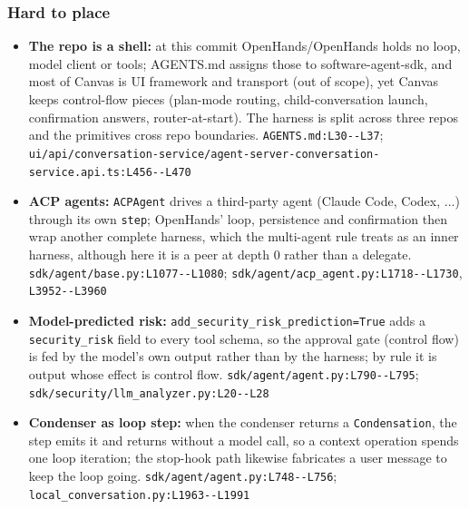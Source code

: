 \subsubsection*{Hard to place}
\begin{itemize}
\item \textbf{The repo is a shell:} at this commit OpenHands/OpenHands holds no loop, model client or tools; AGENTS.md assigns those to software-agent-sdk, and most of Canvas is UI framework and transport (out of scope), yet Canvas keeps control-flow pieces (plan-mode routing, child-conversation launch, confirmation answers, router-at-start). The harness is split across three repos and the primitives cross repo boundaries. \texttt{AGENTS.\allowbreak{}md:\allowbreak{}L30-\allowbreak{}-\allowbreak{}L37}; \texttt{ui/\allowbreak{}api/\allowbreak{}conversation-\allowbreak{}service/\allowbreak{}agent-\allowbreak{}server-\allowbreak{}conversation-\allowbreak{}service.\allowbreak{}api.\allowbreak{}ts:\allowbreak{}L456-\allowbreak{}-\allowbreak{}L470}
\item \textbf{ACP agents:} \texttt{ACPAgent} drives a third-party agent (Claude Code, Codex, ...) through its own \texttt{step}; OpenHands' loop, persistence and confirmation then wrap another complete harness, which the multi-agent rule treats as an inner harness, although here it is a peer at depth 0 rather than a delegate. \texttt{sdk/\allowbreak{}agent/\allowbreak{}base.\allowbreak{}py:\allowbreak{}L1077-\allowbreak{}-\allowbreak{}L1080}; \texttt{sdk/\allowbreak{}agent/\allowbreak{}acp\_\allowbreak{}agent.\allowbreak{}py:\allowbreak{}L1718-\allowbreak{}-\allowbreak{}L1730}, \texttt{L3952-\allowbreak{}-\allowbreak{}L3960}
\item \textbf{Model-predicted risk:} \texttt{add\_\allowbreak{}security\_\allowbreak{}risk\_\allowbreak{}prediction=True} adds a \texttt{security\_\allowbreak{}risk} field to every tool schema, so the approval gate (control flow) is fed by the model's own output rather than by the harness; by rule it is output whose effect is control flow. \texttt{sdk/\allowbreak{}agent/\allowbreak{}agent.\allowbreak{}py:\allowbreak{}L790-\allowbreak{}-\allowbreak{}L795}; \texttt{sdk/\allowbreak{}security/\allowbreak{}llm\_\allowbreak{}analyzer.\allowbreak{}py:\allowbreak{}L20-\allowbreak{}-\allowbreak{}L28}
\item \textbf{Condenser as loop step:} when the condenser returns a \texttt{Condensation}, the step emits it and returns without a model call, so a context operation spends one loop iteration; the stop-hook path likewise fabricates a user message to keep the loop going. \texttt{sdk/\allowbreak{}agent/\allowbreak{}agent.\allowbreak{}py:\allowbreak{}L748-\allowbreak{}-\allowbreak{}L756}; \texttt{local\_\allowbreak{}conversation.\allowbreak{}py:\allowbreak{}L1963-\allowbreak{}-\allowbreak{}L1991}
\end{itemize}

